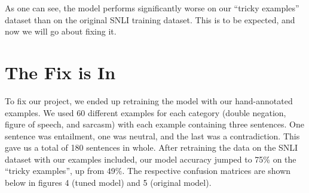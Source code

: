 \documentclass{article}
\begin{document}
As one can see, the model performs significantly worse on our “tricky examples” dataset than on the original SNLI training dataset. This is to be expected, and 
now we will go about fixing it. 

\section{The Fix is In}
To fix our project, we ended up retraining the model with our hand-annotated examples. We used 60 different examples for each category (double negation, figure of 
speech, and sarcasm) with each example containing three sentences. One sentence was entailment, one was neutral, and the last was a contradiction. This gave us a 
total of 180 sentences in whole. After retraining the data on the SNLI dataset with our examples included, our model accuracy jumped to 75\% on the “tricky examples”, 
up from 49\%. The respective confusion matrices are shown below in figures 4 (tuned model) and 5 (original model).
\end{document}
